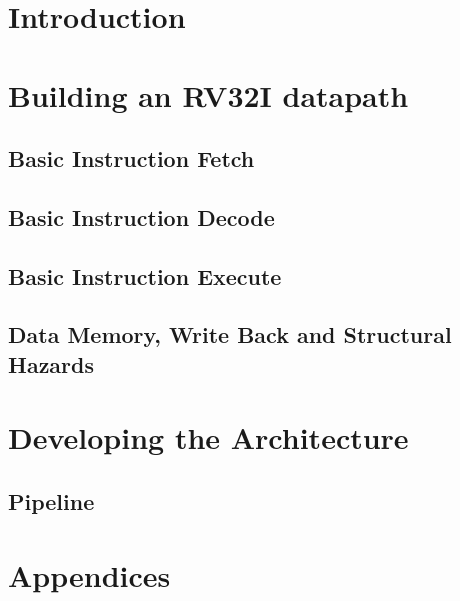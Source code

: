 \documentclass[a4paper]{book}
\begin{document}
\frontmatter
\maketitle

\tableofcontents

\let\cleardoublepage\clearpage
\mainmatter
\chapter{Introduction}


\chapter{Building an RV32I datapath}
\section{Basic Instruction Fetch}


\section{Basic Instruction Decode}

\newpage

\section{Basic Instruction Execute}


\section{Data Memory, Write Back and Structural Hazards}


\chapter{Developing the Architecture}

\section{Pipeline}


\let\cleardoublepage\clearpage

\chapter{Appendices}

 

\end{document}
